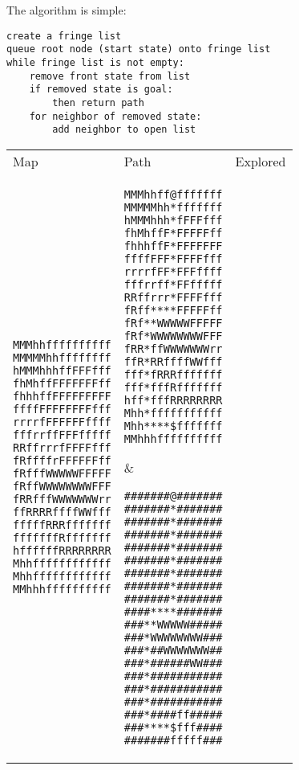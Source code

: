 \documentclass[12pt, article]{scrartcl}
\begin{document}
The algorithm is simple: 

\begin{verbatim}
create a fringe list
queue root node (start state) onto fringe list
while fringe list is not empty:
    remove front state from list
    if removed state is goal:
        then return path
    for neighbor of removed state:
        add neighbor to open list
\end{verbatim}

\begin{tabular}{p{2in} p{2in} p{2in}}
Map & Path & Explored \\
\begin{verbatim}
MMMhhffffffffff
MMMMMhhffffffff
hMMMhhhffFFFfff
fhMhffFFFFFFFff
fhhhffFFFFFFFFF
ffffFFFFFFFFfff
rrrrfFFFFFFffff
fffrrffFFFfffff
RRffrrrfFFFFfff
fRffffrFFFFFFff
fRfffWWWWWFFFFF
fRffWWWWWWWWFFF
fRRfffWWWWWWWrr
ffRRRRffffWWfff
fffffRRRfffffff
fffffffRfffffff
hffffffRRRRRRRR
Mhhffffffffffff
Mhhffffffffffff
MMhhhffffffffff
\end{verbatim}
&
\begin{verbatim}
MMMhhff@fffffff
MMMMMhh*fffffff
hMMMhhh*fFFFfff
fhMhffF*FFFFFff
fhhhffF*FFFFFFF
ffffFFF*FFFFfff
rrrrfFF*FFFffff
fffrrff*FFfffff
RRffrrr*FFFFfff
fRff****FFFFFff
fRf**WWWWWFFFFF
fRf*WWWWWWWWFFF
fRR*ffWWWWWWWrr
ffR*RRffffWWfff
fff*fRRRfffffff
fff*fffRfffffff
hff*fffRRRRRRRR
Mhh*fffffffffff
Mhh****$fffffff
MMhhhffffffffff
\end{verbatim}
&
\begin{verbatim}
#######@#######
#######*#######
#######*#######
#######*#######
#######*#######
#######*#######
#######*#######
#######*#######
#######*#######
####****#######
###**WWWWW#####
###*WWWWWWWW###
###*##WWWWWWW##
###*######WW###
###*###########
###*###########
###*###########
###*####ff#####
###****$fff####
#######fffff###
\end{verbatim}
\end{tabular}
\end{document}
